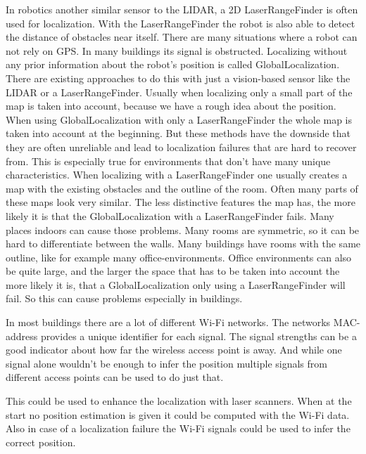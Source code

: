 In robotics another similar sensor to the \Gls{LIDAR}, a 2D \gls{LaserRangeFinder} is often used for localization. With the \gls{LaserRangeFinder} the robot is also able to detect the distance of obstacles near itself. There are many situations where a robot can not rely on \Gls{GPS}. In many buildings its signal is obstructed.
Localizing without any prior information about the robot's position is called \gls{GlobalLocalization}.
There are existing approaches to do this with just a vision-based sensor like the \Gls{LIDAR} or a \gls{LaserRangeFinder}. Usually when localizing only a small part of the map is taken into account, because we have a rough idea about the position. When using \gls{GlobalLocalization} with only a \gls{LaserRangeFinder} the whole map is taken into account at the beginning. 
But these methods have the downside that they are often unreliable and lead to localization failures that are hard to recover from. This is especially true for environments that don't have many unique characteristics. When localizing with a \gls{LaserRangeFinder} one usually creates a map with the existing obstacles and the outline of the room. Often many parts of these maps look very similar. The less distinctive features the map has, the more likely it is that the \gls{GlobalLocalization} with a \gls{LaserRangeFinder} fails. 
Many places indoors can cause those problems. Many rooms are symmetric, so it can be hard to differentiate between the walls. Many buildings have rooms with the same outline, like for example many office-environments. Office environments can also be quite large, and the larger the space that has to be taken into account the more likely it is, that a \gls{GlobalLocalization} only using a \gls{LaserRangeFinder} will fail. So this can cause problems especially in buildings.
 
In most buildings there are a lot of different Wi-Fi\citep{ieee802.11-2012} networks. The networks \Gls{MAC-address} provides a unique identifier for each signal. The signal strengths can be a good indicator about how far the wireless access point is away. And while one signal alone wouldn't be enough to infer the position multiple signals from different access points can be used to do just that.

This could be used to enhance the localization with laser scanners. When at the start no position estimation is given it could be computed with the Wi-Fi data. Also in case of a localization failure the Wi-Fi signals could be used to infer the correct position.

